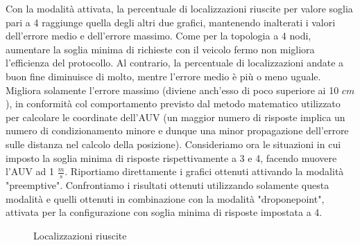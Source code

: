 \documentclass[Lau,binding=0.6cm]{sapthesis}
\begin{document}
Con la modalità attivata, la percentuale di localizzazioni riuscite per valore soglia pari a 4 raggiunge quella degli altri due grafici, mantenendo inalterati i valori dell'errore medio e dell'errore massimo. 
Come per la topologia a 4 nodi, aumentare la soglia minima di richieste con il veicolo fermo non migliora l'efficienza del protocollo. Al contrario, la percentuale di localizzazioni andate a buon fine diminuisce di molto, mentre l'errore medio è più o meno uguale. Migliora solamente l'errore massimo (diviene anch'esso di poco superiore ai 10 $cm$), in conformità col comportamento previsto dal metodo matematico utilizzato per calcolare le coordinate dell'AUV (un maggior numero di risposte implica un numero di condizionamento minore e dunque una minor propagazione dell'errore sulle distanza nel calcolo della posizione).
Consideriamo ora le situazioni in cui imposto la soglia minima di risposte rispettivamente a 3 e 4, facendo muovere l'AUV ad 1 $\frac{m}{s}$.
Riportiamo direttamente i grafici ottenuti attivando la modalità "preemptive". Confrontiamo i risultati ottenuti utilizzando solamente questa modalità e quelli ottenuti in combinazione con la modalità "droponepoint", attivata per la configurazione con soglia minima di risposte impostata a 4.


\begin{figure}[H]
    \centering
    \hfill
    \caption{Localizzazioni riuscite}
\end{figure}
\end{document}
